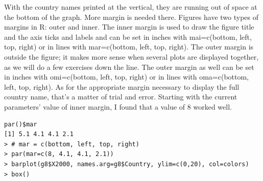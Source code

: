 \documentclass{report}
\newcommand{\code}[1]{\textsf{\ttfamily #1}}
\begin{document}
	With the country names printed at the vertical, they are running out of space at the bottom of the graph. More margin is needed there. Figures have two types of margins in R: outer and inner. The inner margin is used to draw the figure title and the axis ticks and labels and can be set in inches with \code{mai=c(bottom, left, top, right)} or in lines with \code{mar=c(bottom, left, top, right)}. The outer margin is outside the figure; it makes more sense when several plots are displayed together, as we will do a few exercises down the line. The outer margin as well can be set in inches with \code{omi=c(bottom, left, top, right)} or in lines with \code{oma=c(bottom, left, top, right)}. As for the appropriate margin necessary to display the full country name, that's a matter of trial and error. Starting with the current parameters' value of inner margin, I found that a value of 8 worked well.
	\begin{verbatim}
par()$mar
[1] 5.1 4.1 4.1 2.1
> # mar = c(bottom, left, top, right)
> par(mar=c(8, 4.1, 4.1, 2.1))
> barplot(g8$X2000, names.arg=g8$Country, ylim=c(0,20), col=colors)
> box()
	\end{verbatim}
\end{document}
